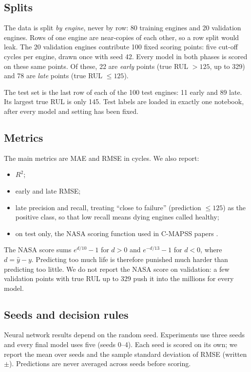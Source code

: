 \documentclass[conference]{IEEEtran}
\begin{document}
\subsection{Splits}
The data is split \emph{by engine}, never by row: 80 training engines and 20 validation engines. Rows of one engine are near-copies of each other, so a row split would leak. The 20 validation engines contribute 100 fixed scoring points: five cut-off cycles per engine, drawn once with seed 42. Every model in both phases is scored on these same points. Of these, 22 are \emph{early} points (true RUL $>125$, up to 329) and 78 are \emph{late} points (true RUL $\le 125$).

The test set is the last row of each of the 100 test engines: 11 early and 89 late. Its largest true RUL is only 145. Test labels are loaded in exactly one notebook, after every model and setting has been fixed.

\subsection{Metrics}
The main metrics are MAE and RMSE in cycles. We also report:
\begin{itemize}
  \item $R^2$;
  \item early and late RMSE;
  \item late precision and recall, treating ``close to failure'' (prediction $\le 125$) as the positive class, so that low recall means dying engines called healthy;
  \item on test only, the NASA scoring function used in C-MAPSS papers \cite{saxena2008damage}.
\end{itemize}
The NASA score sums $e^{d/10}-1$ for $d>0$ and $e^{-d/13}-1$ for $d<0$, where $d=\hat y-y$. Predicting too much life is therefore punished much harder than predicting too little. We do not report the NASA score on validation: a few validation points with true RUL up to 329 push it into the millions for every model.

\subsection{Seeds and decision rules}
Neural network results depend on the random seed. Experiments use three seeds and every final model uses five (seeds 0--4). Each seed is scored on its own; we report the mean over seeds and the sample standard deviation of RMSE (written $\pm$). Predictions are never averaged across seeds before scoring.
\end{document}
